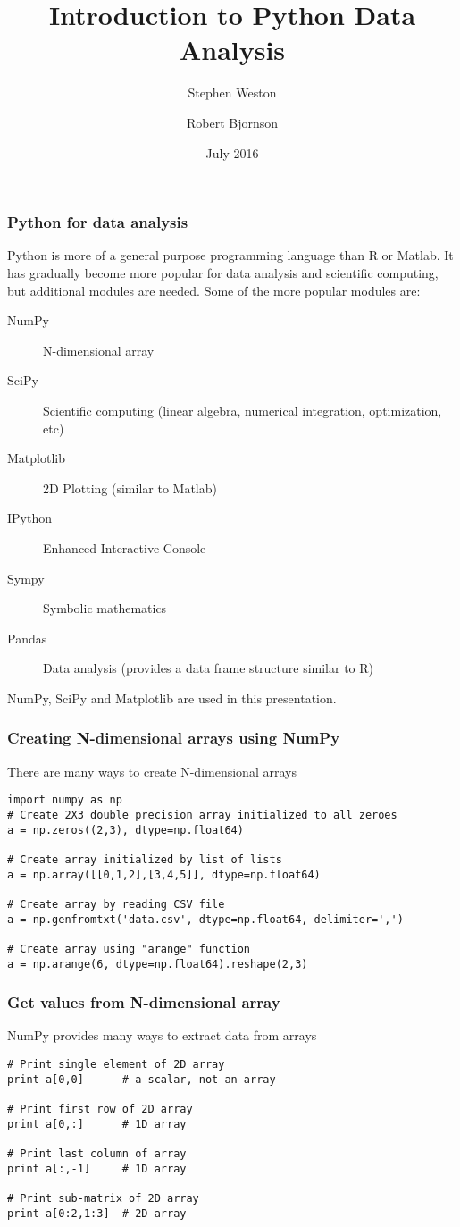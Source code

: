 \documentclass[10pt]{beamer}
\title{Introduction to Python Data Analysis}
\author{{Stephen Weston} \and {Robert Bjornson}}
\institute[Yale]{
  Yale Center for Research Computing \\
  Yale University
}
\date{July 2016}
\begin{document}
\begin{frame}[plain]
  \titlepage
\end{frame}

\begin{frame}
\frametitle{Python for data analysis}
Python is more of a general purpose programming language than
R or Matlab.
It has gradually become more popular for data analysis and
scientific computing, but additional modules are needed.
Some of the more popular modules are:
\begin{description}
\item[NumPy] N-dimensional array
\item[SciPy] Scientific computing (linear algebra, numerical integration, optimization, etc)
\item[Matplotlib] 2D Plotting (similar to Matlab)
\item[IPython] Enhanced Interactive Console
\item[Sympy] Symbolic mathematics
\item[Pandas] Data analysis (provides a data frame structure similar to R)
\end{description}
\vskip10pt
NumPy, SciPy and Matplotlib are used in this presentation.
\end{frame}

\begin{frame}[fragile]
\frametitle{Creating N-dimensional arrays using NumPy}
There are many ways to create N-dimensional arrays
\begin{verbatim}
import numpy as np
# Create 2X3 double precision array initialized to all zeroes
a = np.zeros((2,3), dtype=np.float64)

# Create array initialized by list of lists
a = np.array([[0,1,2],[3,4,5]], dtype=np.float64)

# Create array by reading CSV file
a = np.genfromtxt('data.csv', dtype=np.float64, delimiter=',')

# Create array using "arange" function
a = np.arange(6, dtype=np.float64).reshape(2,3)
\end{verbatim}
\end{frame}

\begin{frame}[fragile]
\frametitle{Get values from N-dimensional array}
NumPy provides many ways to extract data from arrays
\begin{verbatim}
# Print single element of 2D array
print a[0,0]      # a scalar, not an array

# Print first row of 2D array
print a[0,:]      # 1D array

# Print last column of array
print a[:,-1]     # 1D array

# Print sub-matrix of 2D array
print a[0:2,1:3]  # 2D array

\end{verbatim}
\end{frame}
\end{document}
